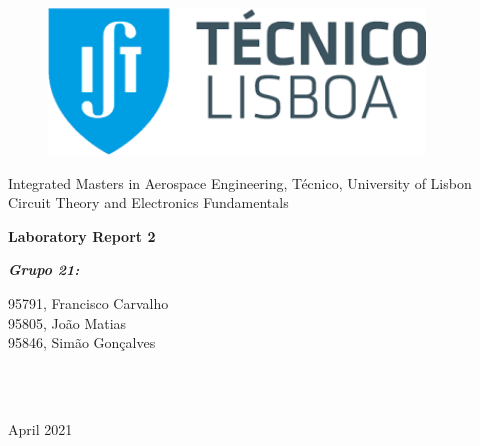 \documentclass[11en, a4paper, oneside]{article}
\begin{document}
\begin{titlepage}
	\begin{center}
		\begin{figure}[htb!]
			\begin{center}
				\includegraphics[width=10cm]{tecnico.png}
			\end{center}
		\end{figure}
		
        \vspace{30pt}
        \begin{center}
        \Large{\center Integrated Masters in Aerospace Engineering, Técnico, University of Lisbon}\\
        \Large{\center Circuit Theory and Electronics Fundamentals}\\
        \end{center}
            
        \vspace{60pt}
        \Huge{\textbf{Laboratory Report 2}}
        
        \vspace{120pt}
        \begin{minipage}{0.4\textwidth}
		\begin{flushleft} \large
			\emph{\LARGE{\textbf{Grupo 21:}}}\par \vspace{10pt}
			95791, Francisco Carvalho \\ \vspace{20pt}
            95805, João Matias\\ \vspace{20pt}
            95846, Simão Gonçalves\\ \vspace{20pt}
		\end{flushleft}
	\end{minipage}
	~
	\begin{minipage}[b]{0.4\textwidth}
		\begin{flushright} \large
        	{}
		\end{flushright}
	\end{minipage}\\[2cm]
       \vspace{10pt}
        \large{April 2021}\\
	\end{center}
\end{titlepage}

\newpage
\renewcommand{\contentsname}{Índice}
\tableofcontents
\thispagestyle{empty}

\newpage
{}
\setcounter{page}{3}





\end{document}
